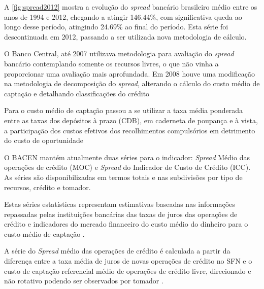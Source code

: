 \documentclass[12pt,12pt,openright,oneside,a4paper,chapter=TITLE,section=TITLE,subsection=TITLE,subsubsection=TITLE,english,french,spanish,portugues,sumario=tradicional]{abntex2}
\begin{document}
A \autoref{fig:spread2012} mostra a evolução do \emph{spread} bancário brasileiro
médio entre os anos de 1994 e 2012, chegando a atingir 146.44\%, com
significativa queda ao longo desse período, atingindo 24.69\% ao final
do período. Esta série foi descontinuada em 2012, passando a ser utilizada nova
metodologia de cálculo.

O Banco Central, até 2007 utilizava metodologia para avaliação do \emph{spread}
bancário contemplando somente os recursos livres, o que não vinha a
proporcionar uma avaliação mais aprofundada. Em 2008 houve uma modificação na
metodologia de decomposição do \emph{spread}, alterando o cálculo do custo médio de
captação e detalhando classificações do crédito \cite{dantas:2012}

Para o custo médio de captação passou a se utilizar a taxa média ponderada
entre as taxas dos depósitos à prazo (CDB), em caderneta de poupança e à vista,
a participação dos custos efetivos dos recolhimentos compulsórios em detrimento
do custo de oportunidade \cite{dantas:2012}

O BACEN mantém atualmente duas séries para o indicador: \emph{Spread} Médio das operações de crédito (MOC) e \emph{Spread} do Indicador de Custo de Crédito (ICC). As séries são disponibilizadas em termos totais e nas subdivisões por tipo de
recursos, crédito e tomador.

Estas séries estatísticas representam estimativas baseadas nas informações
repassadas pelas instituições bancárias das taxas de juros das operações de
crédito e indicadores do mercado financeiro do custo médio do dinheiro para o
custo médio de captação \cite{BCB:2016}.

A série do \emph{Spread} médio das operações de crédito é calculada a partir da
diferença entre a taxa média de juros de novas operações de crédito no SFN e o
custo de captação referencial médio de operações de crédito livre, direcionado
e não rotativo podendo ser observados por tomador \cite{BCB:2016}.
\end{document}
